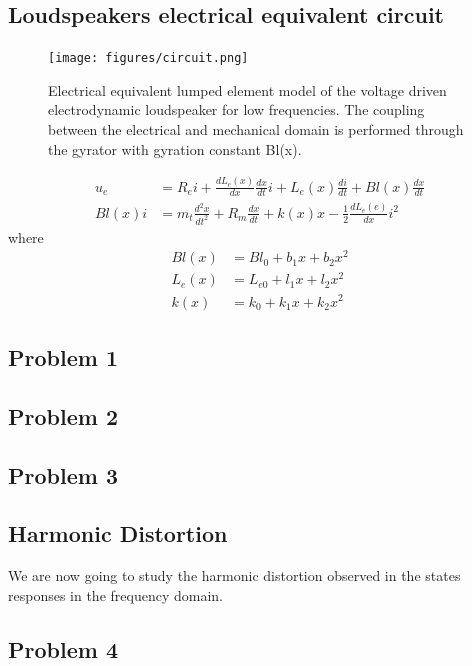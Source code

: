 \documentclass[12pt,a4paper,fleqn, onesside]{report}
\begin{document}
\subsection{Loudspeakers electrical equivalent circuit}

\begin{figure}[H]
\texttt{[image: figures/circuit.png]}
\caption{Electrical equivalent lumped element model of the voltage driven electrodynamic loudspeaker for low frequencies. The coupling between the electrical and mechanical domain is performed through the gyrator with gyration constant Bl(x).}
\label{circuit}
\end{figure}

\begin{align} 
  u_e &= R_ei+\frac{dL_e(x)}{dx}\frac{dx}{dt}i+L_e(x)\frac{di}{dt}+Bl(x)\frac{dx}{dt} \label{eq:1.1} \\     
  Bl(x)i &= m_t\frac{d^2x}{dt^2}+R_m\frac{dx}{dt}+k(x)x-\frac{1}{2}\frac{dL_e(e)}{dx}i^2 \label{eq:1.2}
\end{align}
where
\begin{align}
  Bl(x) &= Bl_0+b_1x+b_2x^2 \label{eq:1.3}  \\
  L_e(x) &= L_{e0}+l_1x+l_2x^2 \label{eq:1.4}  \\
  k(x) &= k_0+k_1x+k_2x^2 \label{eq:1.5} 
\end{align}

\subsection*{Problem 1}

\subsection*{Problem 2}

\subsection*{Problem 3}


\subsection{Harmonic Distortion}
We are now going to study the harmonic distortion observed in the states responses in the frequency domain. 
\subsection*{Problem 4}

\end{document}
